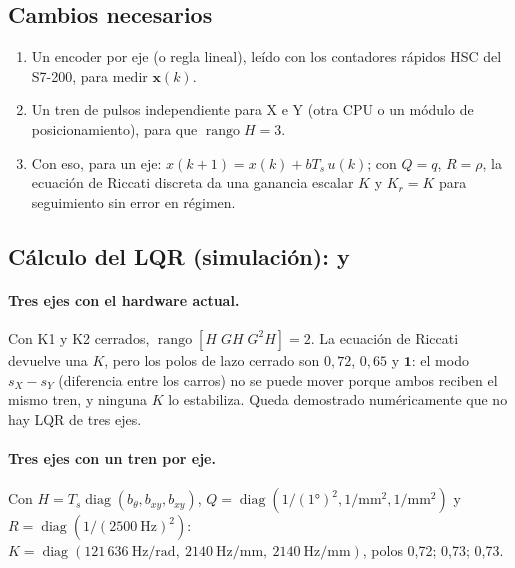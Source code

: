 \documentclass[a4paper,11pt]{article}
\begin{document}
\subsection{Cambios necesarios}
\begin{enumerate}
\item Un encoder por eje (o regla lineal), leído con los contadores rápidos HSC del S7-200, para medir $\mathbf{x}(k)$.
\item Un tren de pulsos independiente para X e Y (otra CPU o un módulo de posicionamiento), para que $\operatorname{rango} H = 3$.
\item Con eso, para un eje: $x(k+1) = x(k) + bT_s\,u(k)$; con $Q = q$, $R = \rho$, la ecuación de Riccati discreta da una ganancia escalar $K$ y $K_r = K$ para seguimiento sin error en régimen.
\end{enumerate}

\subsection{Cálculo del LQR (simulación):  y }
\paragraph{Tres ejes con el hardware actual.} Con K1 y K2 cerrados, $\operatorname{rango}[H\;GH\;G^2H] = 2$. La ecuación de Riccati devuelve una $K$, pero los polos de lazo cerrado son $0{,}72$, $0{,}65$ y $\mathbf{1}$: el modo $s_X - s_Y$ (diferencia entre los carros) no se puede mover porque ambos reciben el mismo tren, y ninguna $K$ lo estabiliza. Queda demostrado numéricamente que no hay LQR de tres ejes.

\paragraph{Tres ejes con un tren por eje.} Con $H = T_s\operatorname{diag}(b_\theta, b_{xy}, b_{xy})$, $Q = \operatorname{diag}(1/(1°)^2, 1/\text{mm}^2, 1/\text{mm}^2)$ y $R = \operatorname{diag}(1/(2500~\text{Hz})^2)$: $K = \operatorname{diag}(121\,636~\text{Hz/rad},\ 2140~\text{Hz/mm},\ 2140~\text{Hz/mm})$, polos 0,72; 0,73; 0,73.
\end{document}
